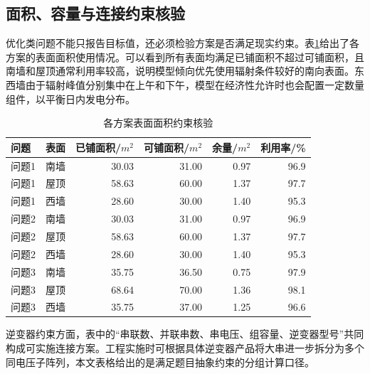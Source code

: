 \documentclass[UTF8,a4paper,12pt]{ctexart}
\begin{document}
\subsection{面积、容量与连接约束核验}
优化类问题不能只报告目标值，还必须检验方案是否满足现实约束。表\ref{tab:areacheck}给出了各方案的表面面积使用情况。可以看到所有表面均满足已铺面积不超过可铺面积，且南墙和屋顶通常利用率较高，说明模型倾向优先使用辐射条件较好的南向表面。东西墙由于辐射峰值分别集中在上午和下午，模型在经济性允许时也会配置一定数量组件，以平衡日内发电分布。
\begin{table}[H]\centering\caption{各方案表面面积约束核验}\label{tab:areacheck}\small
\begin{tabular}{llrrrr}\toprule
问题 & 表面 & 已铺面积/$m^2$ & 可铺面积/$m^2$ & 余量/$m^2$ & 利用率/\%\\\midrule
问题1 & 南墙 & 30.03 & 31.00 & 0.97 & 96.9\\
问题1 & 屋顶 & 58.63 & 60.00 & 1.37 & 97.7\\
问题1 & 西墙 & 28.60 & 30.00 & 1.40 & 95.3\\
问题2 & 南墙 & 30.03 & 31.00 & 0.97 & 96.9\\
问题2 & 屋顶 & 58.63 & 60.00 & 1.37 & 97.7\\
问题2 & 西墙 & 28.60 & 30.00 & 1.40 & 95.3\\
问题3 & 南墙 & 35.75 & 36.50 & 0.75 & 97.9\\
问题3 & 屋顶 & 68.64 & 70.00 & 1.36 & 98.1\\
问题3 & 西墙 & 35.75 & 37.00 & 1.25 & 96.6\\
\bottomrule\end{tabular}\end{table}

逆变器约束方面，表中的“串联数、并联串数、串电压、组容量、逆变器型号”共同构成可实施连接方案。工程实施时可根据具体逆变器产品将大串进一步拆分为多个同电压子阵列，本文表格给出的是满足题目抽象约束的分组计算口径。
\end{document}
